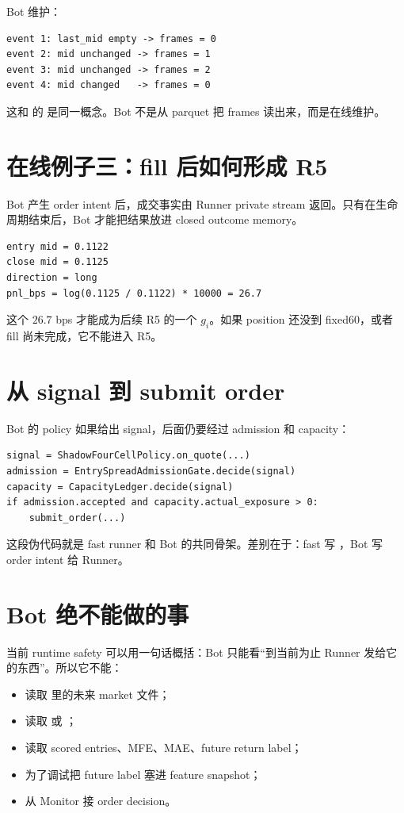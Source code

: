 Bot 维护：

\begin{lstlisting}
event 1: last_mid empty -> frames = 0
event 2: mid unchanged -> frames = 1
event 3: mid unchanged -> frames = 2
event 4: mid changed   -> frames = 0
\end{lstlisting}

这和  的  是同一概念。Bot 不是从 parquet 把 frames 读出来，而是在线维护。

\section{在线例子三：fill 后如何形成 R5}

Bot 产生 order intent 后，成交事实由 Runner private stream 返回。只有在生命周期结束后，Bot 才能把结果放进 closed outcome memory。

\begin{lstlisting}
entry mid = 0.1122
close mid = 0.1125
direction = long
pnl_bps = log(0.1125 / 0.1122) * 10000 = 26.7
\end{lstlisting}

这个 \(26.7\) bps 才能成为后续 R5 的一个 \(g_i\)。如果 position 还没到 fixed60，或者 fill 尚未完成，它不能进入 R5。

\section{从 signal 到 submit order}

Bot 的 policy 如果给出 signal，后面仍要经过 admission 和 capacity：

\begin{lstlisting}
signal = ShadowFourCellPolicy.on_quote(...)
admission = EntrySpreadAdmissionGate.decide(signal)
capacity = CapacityLedger.decide(signal)
if admission.accepted and capacity.actual_exposure > 0:
    submit_order(...)
\end{lstlisting}

这段伪代码就是 fast runner 和 Bot 的共同骨架。差别在于：fast 写 ，Bot 写 order intent 给 Runner。

\section{Bot 绝不能做的事}

当前 runtime safety 可以用一句话概括：Bot 只能看“到当前为止 Runner 发给它的东西”。所以它不能：

\begin{itemize}[leftmargin=2em]
  \item 读取  里的未来 market 文件；
  \item 读取  或 ；
  \item 读取 scored entries、MFE、MAE、future return label；
  \item 为了调试把 future label 塞进 feature snapshot；
  \item 从 Monitor 接 order decision。
\end{itemize}

